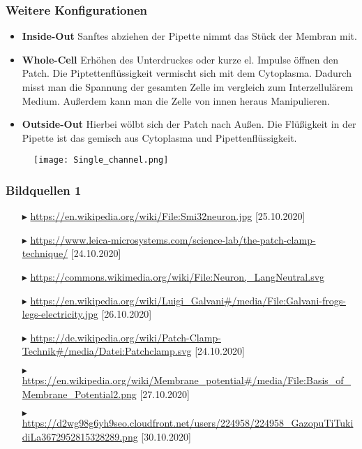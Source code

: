 \documentclass[ngerman]{beamer}
\begin{document}
\begin{frame}\frametitle{ Weitere Konfigurationen }

\begin{itemize}
	\item \textbf{Inside-Out} Sanftes abziehen der Pipette nimmt das Stück der Membran mit.
	\item \textbf{Whole-Cell} Erhöhen des Unterdruckes oder kurze el. Impulse öffnen den Patch. Die Piptettenflüssigkeit vermischt sich mit dem Cytoplasma. Dadurch misst man die Spannung der gesamten Zelle im vergleich zum Interzellulärem Medium. Außerdem kann man die Zelle von innen heraus Manipulieren.
	\item \textbf{Outside-Out} Hierbei wölbt sich der Patch nach Außen. Die Flüßigkeit in der Pipette ist das gemisch aus Cytoplasma und Pipettenflüssigkeit. 
\end{itemize}
\begin{figure}[h]
	\centering
	\texttt{[image: Single\_channel.png]}
\end{figure}

\end{frame}


\begin{frame}\frametitle{ Bildquellen 1 }

\begin{itemize}
	\item[$\blacktriangleright$] \url{https://en.wikipedia.org/wiki/File:Smi32neuron.jpg}\label{img:0} [25.10.2020]
	\item[$\blacktriangleright$] \url{https://www.leica-microsystems.com/science-lab/the-patch-clamp-technique/} [24.10.2020]
	\item[$\blacktriangleright$] \url{https://commons.wikimedia.org/wiki/File:Neuron,_LangNeutral.svg} \label{img:1}
	\item[$\blacktriangleright$] \url{https://en.wikipedia.org/wiki/Luigi_Galvani#/media/File:Galvani-frogs-legs-electricity.jpg} [26.10.2020] 
	\item[$\blacktriangleright$] \url{https://de.wikipedia.org/wiki/Patch-Clamp-Technik#/media/Datei:Patchclamp.svg} [24.10.2020]
	\item[$\blacktriangleright$] \url{https://en.wikipedia.org/wiki/Membrane_potential#/media/File:Basis_of_Membrane_Potential2.png} [27.10.2020]
	\item[$\blacktriangleright$] \url{https://d2wg98g6yh9seo.cloudfront.net/users/224958/224958_GazopuTiTukidiLa3672952815328289.png} [30.10.2020]

\end{itemize}

\end{frame}
\end{document}
